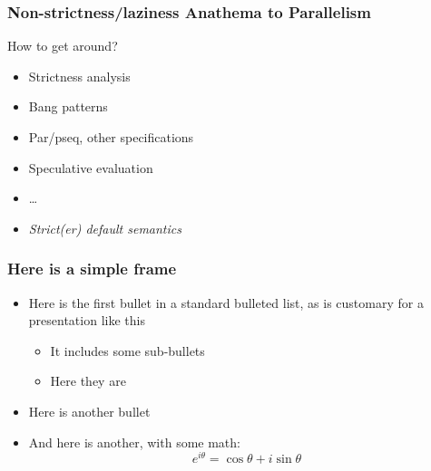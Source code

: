 \documentclass{beamer}
\begin{document}
\begin{frame}
\frametitle{Non-strictness/laziness Anathema to Parallelism}
How to get around?
\begin{itemize}
  \item Strictness analysis
  \item Bang patterns
  \item Par/pseq, other specifications
  \item Speculative evaluation
  \item \ldots
  \item \emph{Strict(er) default semantics}
\end{itemize}
\end{frame}


\begin{frame}
\frametitle{Here is a simple frame}
    \begin{itemize}
        \item Here is the first bullet in a standard bulleted list,
            as is customary for a presentation like this
        \begin{itemize}
            \item It includes some sub-bullets
            \item Here they are
        \end{itemize}
        \item Here is another bullet
        \item And here is another, with some math:
            \[ e^{i\theta} = \cos \theta + i \sin \theta \]
    \end{itemize}
\end{frame}
\end{document}
